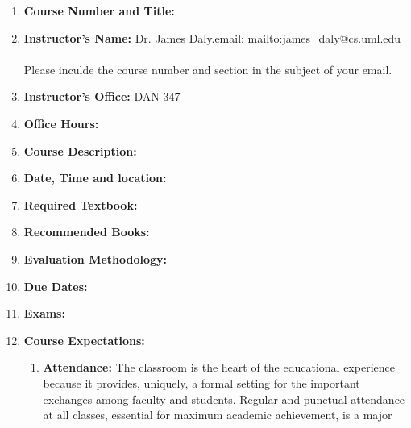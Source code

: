 \documentclass[10pt]{article}
\begin{document}
  \begin{center}\Huge

  \end{center}
  \begin{enumerate}
    \item {\bf Course Number and Title:} \courseno{} \fullcoursename{}
    \item {\bf Instructor's Name:} Dr. James Daly.\quad{}email:
      \url{mailto:james_daly@cs.uml.edu} \\\\
      Please inculde the course number and section in the subject of
      your email.
    \item {\bf Instructor's Office:} DAN-347
    \item {\bf Office Hours:} 
      
%      
    \item {\bf Course Description:} 
      
%      
%       
      
    \item {\bf Date, Time and location:} 
      
    \item {\bf Required Textbook:} 
      
    \item {\bf Recommended Books:}
      
         \item {\bf Evaluation Methodology:}\\
       
     \item {\bf Due Dates:} 
       
     \item {\bf Exams:} 
       
    \item {\bf Course Expectations:}
       \begin{enumerate}[label=\alph*.]
         \item {\bf Attendance:}
           The classroom is the heart of the educational experience
           because it provides, uniquely, a formal 
           setting for the important exchanges among faculty and
           students. Regular and punctual attendance at all classes,
           essential for maximum academic achievement, is a major

\end{enumerate}
\end{enumerate}
\end{document}
